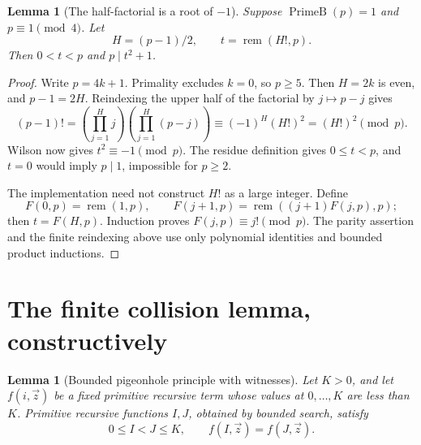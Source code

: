 \documentclass[11pt,letterpaper]{article}
\newtheorem{lemma}[theorem]{Lemma}
\theoremstyle{definition}
\theoremstyle{remark}
\newcommand{\PrimeB}{\operatorname{PrimeB}}
\newcommand{\remd}{\operatorname{rem}}
\begin{document}
\begin{lemma}[The half-factorial is a root of \(-1\)]
\label{lem:root}
Suppose \(\PrimeB(p)=1\) and \(p\equiv1\pmod4\). Let
\[
 H=(p-1)/2,\qquad t=\remd(H!,p).
\]
Then \(0<t<p\) and \(p\mid t^2+1\).
\end{lemma}

\begin{proof}
Write \(p=4k+1\). Primality excludes \(k=0\), so \(p\ge5\).
Then \(H=2k\) is even, and \(p-1=2H\). Reindexing the upper half of the
factorial by \(j\mapsto p-j\) gives
\[
 (p-1)!
 =\left(\prod_{j=1}^{H}j\right)
   \left(\prod_{j=1}^{H}(p-j)\right)
 \equiv (-1)^H(H!)^2
 =(H!)^2\pmod p.
\]
Wilson now gives \(t^2\equiv-1\pmod p\).
The residue definition gives \(0\le t<p\), and \(t=0\) would imply
\(p\mid1\), impossible for \(p\ge2\).

The implementation need not construct \(H!\) as a large integer. Define
\[
 F(0,p)=\remd(1,p),\qquad
 F(j+1,p)=\remd((j+1)F(j,p),p);
\]
then \(t=F(H,p)\). Induction proves \(F(j,p)\equiv j!\pmod p\).
The parity assertion and the finite reindexing above use only polynomial
identities and bounded product inductions.
\end{proof}

\section{The finite collision lemma, constructively}
\label{sec:php}

\begin{lemma}[Bounded pigeonhole principle with witnesses]
\label{lem:php}
Let \(K>0\), and let \(f(i,\vec z)\) be a fixed primitive recursive
term whose values at \(0,\ldots,K\) are less than \(K\).
Primitive recursive functions \(I,J\), obtained by bounded search, satisfy
\[
 0\le I<J\le K,\qquad f(I,\vec z)=f(J,\vec z).
\]
\end{lemma}
\end{document}
